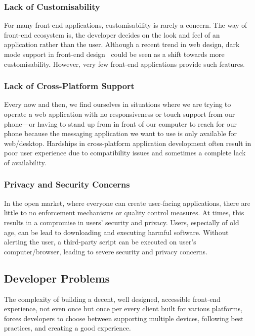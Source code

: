 \subsubsection{Lack of Customisability}
For many front-end applications, customisability is rarely a concern. The way of front-end ecosystem is, the developer decides on the look and feel of an application rather than the user. Although a recent trend in web design, dark mode support in front-end design~\cite{DarkMode} could be seen as a shift towards more customisability. However, very few front-end applications provide such features.

\subsubsection{Lack of Cross-Platform Support}
Every now and then, we find ourselves in situations where we are trying to operate a web application with no responsiveness or touch support from our phone—or having to stand up from in front of our computer to reach for our phone because the messaging application we want to use is only available for web/desktop. Hardships in cross-platform application development often result in poor user experience due to compatibility issues and sometimes a complete lack of availability.

\subsubsection{Privacy and Security Concerns}
In the open market, where everyone can create user-facing applications, there are little to no enforcement mechanisms or quality control measures. At times, this results in a compromise in users' security and privacy. Users, especially of old age, can be lead to downloading and executing harmful software. Without alerting the user, a third-party script can be executed on user's computer/browser, leading to severe security and privacy concerns. 


\subsection{Developer Problems}

The complexity of building a decent, well designed, accessible front-end experience, not even once but once per every client built for various platforms, forces developers to choose between supporting multiple devices, following best practices, and creating a good experience.

